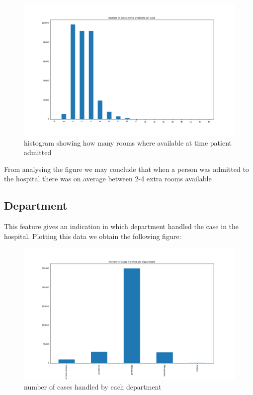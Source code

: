 \documentclass[fleqn]{article}
\begin{document}
			\begin{figure}[hb]
  				\includegraphics[width=\linewidth]{Extraroom_hist.png}
  				\caption{histogram showing how many rooms where available at time 						patient admitted}
  				\label{fig:7}
			\end{figure} 
			\FloatBarrier
			
			From analysing the figure we may conclude that when a person was admitted to the hospital there was on average between 2-4 extra rooms available
			
		\newpage
		\subsection*{Department}
			This feature gives an indication in which department handled the case in the hospital. Plotting this data we obtain the following figure:
			
			\begin{figure}[hb]
  				\includegraphics[width=\linewidth]{department_hist.png}
  				\caption{number of cases handled by each department}
  				\label{fig:8}
			\end{figure} 
			\FloatBarrier
			
\end{document}
